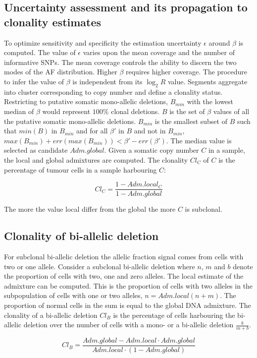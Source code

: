 	\subsection{Uncertainty assessment and its propagation to clonality estimates}
	To optimize sensitivity and specificity the estimation uncertainty $\epsilon$ around $\beta$ is computed.
	The value of $\epsilon$ varies upon the mean coverage and the number of informative SNPs.
	The mean coverage controls the ability to discern the two modes of the AF distribution.
	Higher $\beta$ requires higher coverage.
	The procedure to infer the value of $\beta$ is independent from its $\log_2 R$ value.
	Segments aggregate into cluster corresponding to copy number and define a clonality status.
	Restricting to putative somatic mono-allelic deletions, $B_{min}$ with the lowest median of $\beta$ would represent $100\%$ clonal deletions.
	$B$ is the set of $\beta$ values of all the putative somatic mono-allelic deletions.
	$B_{min}$ is the smallest subset of $B$ such that $min(B)$ in $B_{min}$ and for all $\beta'$ in $B$ and not in $B_{min}$, $max(B_{min})+err(max(B_{min})) < \beta'-err(\beta')$.
	The median value is selected as candidate $Adm.global$.
	Given a somatic copy number $C$ in a sample, the local and global admixtures are computed.
	The clonality $Cl_C$ of $C$ is the percentage of tumour cells in a sample harbouring $C$:

	$$Cl_C = \frac{1-Adm.local_C}{1-Adm.global}$$

	The more the value local differ from the global the more $C$ is subclonal.

	\subsection{Clonality of bi-allelic deletion}
	For subclonal bi-allelic deletion the allelic fraction signal comes from cells with two or one allele.
	Consider a subclonal bi-allelic deletion where $n$, $m$ and $b$ denote the proportion of cells with two, one and zero alleles.
	The local estimate of the admixture can be computed.
	This is the proportion of cells with two alleles in the subpopulation of cells with one or two alleles, $n = Adm.local(n+m)$.
	The proportion of normal cells in the sum is equal to the global DNA admixture.
	The clonality of a bi-allelic deletion $Cl_B$ is the percentage of cells harbouring the bi-allelic deletion over the number of cells with a mono- or a bi-allelic deletion $\frac{b}{m+b}$.

	$$Cl_B = \frac{Adm.global - Adm.local\cdot Adm.global}{Adm.local\cdot(1-Adm.global)}$$
